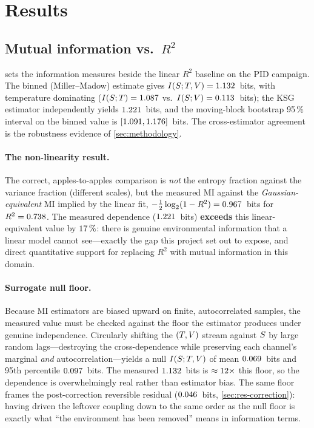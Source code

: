 \section{Results}
\label{sec:results}


\subsection{Mutual information vs.\ $R^2$}
\label{sec:res-mi}
 sets the information measures beside the linear $R^2$
baseline on the PID campaign. The binned (Miller--Madow) estimate gives
$I\!\left(S ; T,V\right)=1.132$~bits, with temperature dominating
($I\!\left(S ; T\right)=1.087$ vs.\ $I\!\left(S ; V\right)=0.113$~bits); the KSG
estimator independently yields $1.221$~bits, and the moving-block bootstrap
95\,\% interval on the binned value is $[1.091,1.176]$~bits. The
cross-estimator agreement is the robustness evidence of \cref{sec:methodology}.

\paragraph{The non-linearity result.} The correct, apples-to-apples comparison is
\emph{not} the entropy fraction against the variance fraction (different scales),
but the measured MI against the \emph{Gaussian-equivalent} MI implied by the
linear fit, $-\tfrac12\log_2(1-R^2)=0.967$~bits for
$R^2=0.738$. The measured dependence ($1.221$~bits) \textbf{exceeds}
this linear-equivalent value by $17\,\%$: there is genuine
environmental information that a linear model cannot see---exactly the gap this
project set out to expose, and direct quantitative support for replacing $R^2$
with mutual information in this domain.

\paragraph{Surrogate null floor.} Because MI estimators are biased upward on
finite, autocorrelated samples, the measured value must be checked against the
floor the estimator produces under genuine independence. Circularly shifting the
$(T,V)$ stream against $S$ by large random lags---destroying the
cross-dependence while preserving each channel's marginal \emph{and}
autocorrelation---yields a null $I\!\left(S ; T,V\right)$ of mean
$0.069$~bits and 95th percentile $0.097$~bits. The measured
$1.132$~bits is $\approx12\times$ this floor, so the dependence
is overwhelmingly real rather than estimator bias. The same floor frames the
post-correction reversible residual ($0.046$~bits, \cref{sec:res-correction}):
having driven the leftover coupling down to the same order as the null floor is
exactly what ``the environment has been removed'' means in information terms.

